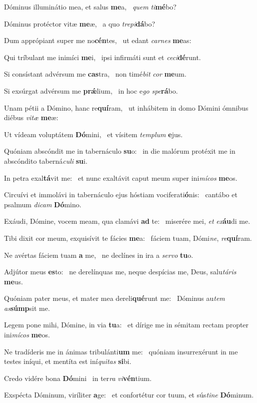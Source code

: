 \item Dóminus illuminátio mea, et salus \textbf{me}a,~\psstar{} \textit{quem} \textit{ti}\textbf{mé}bo?
\item Dóminus protéctor vitæ \textbf{me}æ,~\psstar{} a quo \textit{trepi}\textbf{dá}bo?
\item Dum apprópiant super me no\textbf{cén}tes,~\psstar{} ut edant \textit{carnes} \textbf{me}as:
\item Qui tríbulant me inimíci \textbf{me}i,~\psstar{} ipsi infirmáti sunt et \textit{ceci}\textbf{dé}runt.
\item Si consístant advérsum me \textbf{cas}tra,~\psstar{} non timé\textit{bit} \textit{cor} \textbf{me}um.
\item Si exsúrgat advérsum me \textbf{prǽ}lium,~\psstar{} in hoc e\textit{go} \textit{spe}\textbf{rá}bo.
\item Unam pétii a Dómino, hanc re\textbf{quí}ram,~\psstar{} ut inhábitem in domo Dómini ómnibus diébus \textit{vitæ} \textbf{me}æ:
\item Ut vídeam voluptátem \textbf{Dó}mini,~\psstar{} et vísitem \textit{templum} \textbf{e}jus.
\item Quóniam abscóndit me in tabernáculo \textbf{su}o:~\psstar{} in die malórum protéxit me in abscóndito taberná\textit{culi} \textbf{su}i.
\item In petra exal\textbf{tá}vit me:~\psstar{} et nunc exaltávit caput meum super ini\textit{mícos} \textbf{me}os.
\item Circuívi et immolávi in tabernáculo ejus hóstiam vociferati\textbf{ó}nis:~\psstar{} cantábo et psalmum \textit{dicam} \textbf{Dó}mino.
\item Exáudi, Dómine, vocem meam, qua clamávi \textbf{ad} te:~\psstar{} miserére mei, \textit{et} \textit{ex}\textbf{áu}di me.
\item Tibi dixit cor meum, exquisívit te fácies \textbf{me}a:~\psstar{} fáciem tuam, Dómi\textit{ne}, \textit{re}\textbf{quí}ram.
\item Ne avértas fáciem tuam \textbf{a} me,~\psstar{} ne declínes in ira a \textit{servo} \textbf{tu}o.
\item Adjútor meus \textbf{es}to:~\psstar{} ne derelínquas me, neque despícias me, Deus, salu\textit{táris} \textbf{me}us.
\item Quóniam pater meus, et mater mea dereli\textbf{qué}runt me:~\psstar{} Dóminus au\textit{tem} \textit{as}\textbf{súmp}sit me.
\item Legem pone mihi, Dómine, in via \textbf{tu}a:~\psstar{} et dírige me in sémitam rectam propter ini\textit{mícos} \textbf{me}os.
\item Ne tradíderis me in ánimas tribulánti\textbf{um} me:~\psstar{} quóniam insurrexérunt in me testes iníqui, et mentíta est iní\textit{quitas} \textbf{si}bi.
\item Credo vidére bona \textbf{Dó}mini~\psstar{} in ter\textit{ra} \textit{vi}\textbf{vén}tium.
\item Exspécta Dóminum, viríliter \textbf{a}ge:~\psstar{} et confortétur cor tuum, et sús\textit{tine} \textbf{Dó}minum.
